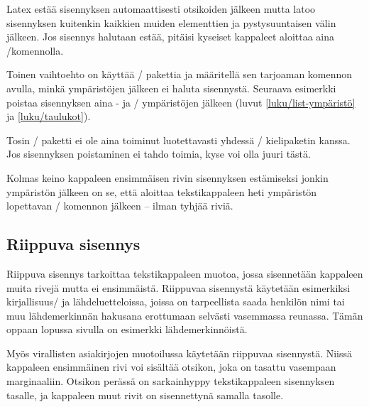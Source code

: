 Latex estää sisennyksen automaattisesti otsikoiden jälkeen mutta latoo
sisennyksen kuitenkin kaikkien muiden elementtien ja pystysuuntaisen
välin jälkeen. Jos sisennys halutaan estää, pitäisi kyseiset kappaleet
aloittaa aina \-/komennolla.

Toinen vaihtoehto on käyttää \-/ pakettia ja
määritellä sen tarjoaman komennon avulla, minkä ympäristöjen jälkeen ei
haluta sisennystä. Seuraava esimerkki poistaa sisennyksen aina
- ja \-/ ympäristöjen jälkeen (luvut
\ref{luku/list-ympäristö} ja \ref{luku/taulukot}).

\begin{koodilohkosis}
\end{koodilohkosis}

\noindent
Tosin \-/ paketti ei ole aina toiminut
luotettavasti yhdessä \-/ kielipaketin kanssa. Jos
sisennyksen poistaminen ei tahdo toimia, kyse voi olla juuri tästä.

Kolmas keino kappaleen ensimmäisen rivin sisennyksen estämiseksi jonkin
ympäristön jälkeen on se, että aloittaa tekstikappaleen heti ympäristön
lopettavan \-/ komennon jälkeen -- ilman tyhjää riviä.

\subsection{Riippuva sisennys}
\label{luku/riippuva-sisennys}

Riippuva sisennys tarkoittaa tekstikappaleen muotoa, jossa sisennetään
kappaleen muita rivejä mutta ei ensimmäistä. Riippuvaa sisennystä
käytetään esimerkiksi kirjallisuus\-/{} ja lähdeluetteloissa, joissa on
tarpeellista saada henkilön nimi tai muu lähdemerkinnän hakusana
erottumaan selvästi vasemmassa reunassa. Tämän oppaan lopussa sivulla
\pageref{luku/kirjallisuutta} on esimerkki lähdemerkinnöistä.

Myös virallisten asiakirjojen muotoilussa käytetään riippuvaa
sisennystä. Niissä kappaleen ensimmäinen rivi voi sisältää otsikon, joka
on tasattu vasempaan marginaaliin. Otsikon perässä on sarkainhyppy
tekstikappaleen sisennyksen tasalle, ja kappaleen muut rivit on
sisennettynä samalla tasolle.

